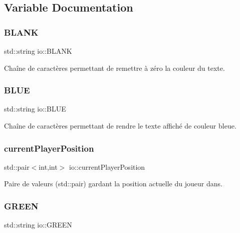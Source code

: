\subsection{Variable Documentation}
\mbox{\label{namespaceio_a24918bdd47093eb3f11b694ad6f832d4}} 
\subsubsection{\texorpdfstring{B\+L\+A\+NK}{BLANK}}
{\footnotesize\ttfamily std\+::string io\+::\+B\+L\+A\+NK}



Chaîne de caractères permettant de remettre à zéro la couleur du texte. 

\mbox{\label{namespaceio_aad76ed62886e76ca53a755d1c917e387}} 
\subsubsection{\texorpdfstring{B\+L\+UE}{BLUE}}
{\footnotesize\ttfamily std\+::string io\+::\+B\+L\+UE}



Chaîne de caractères permettant de rendre le texte affiché de couleur bleue. 

\mbox{\label{namespaceio_a2a0c75ff7760b96fcf6e696efe3d1c51}} 
\subsubsection{\texorpdfstring{current\+Player\+Position}{currentPlayerPosition}}
{\footnotesize\ttfamily std\+::pair$<$int,int$>$ io\+::current\+Player\+Position}



Paire de valeurs (std\+::pair) gardant la position actuelle du joueur dans. 

\mbox{\label{namespaceio_a38fffa22831731f5fc0b72700dc75c87}} 
\subsubsection{\texorpdfstring{G\+R\+E\+EN}{GREEN}}
{\footnotesize\ttfamily std\+::string io\+::\+G\+R\+E\+EN}



